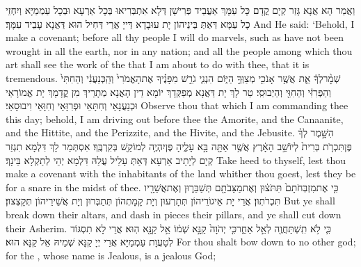 {וַאֲמַר הָא אֲנָא גָּזַר קְיָם קֳדָם כָּל עַמָּךְ אַעֲבֵיד פְּרִישָׁן דְּלָא אִתְבְּרִיאוּ בְּכָל אַרְעָא וּבְכָל עַמְמַיָּא וְיִחְזֵי כָל עַמָּא דְּאַתְּ בֵּינֵיהוֹן יָת עוּבָדָא דַּייָ אֲרֵי דְּחִיל הוּא דַּאֲנָא עָבֵיד עִמָּךְ׃}
{And He said: ‘Behold, I make a covenant; before all thy people I will do marvels, such as have not been wrought in all the earth, nor in any nation; and all the people among which thou art shall see the work of the \lord\space that I am about to do with thee, that it is tremendous.}{}
{שְׁמׇ֨ר\maqqaf לְךָ֔ אֵ֛ת אֲשֶׁ֥ר אָנֹכִ֖י מְצַוְּךָ֣ הַיּ֑וֹם הִנְנִ֧י גֹרֵ֣שׁ מִפָּנֶ֗יךָ אֶת\maqqaf הָאֱמֹרִי֙ וְהַֽכְּנַעֲנִ֔י וְהַחִתִּי֙ וְהַפְּרִזִּ֔י וְהַחִוִּ֖י וְהַיְבוּסִֽי׃}
{טַר לָךְ יָת דַּאֲנָא מְפַקְּדָךְ יוֹמָא דֵין הָאֲנָא מְתָרֵיךְ מִן קֳדָמָךְ יָת אֱמוֹרָאֵי וּכְנַעֲנָאֵי וְחִתָּאֵי וּפְרִזָּאֵי וְחִוָּאֵי וִיבוּסָאֵי׃}
{Observe thou that which I am commanding thee this day; behold, I am driving out before thee the Amorite, and the Canaanite, and the Hittite, and the Perizzite, and the Hivite, and the Jebusite.}{}
{הִשָּׁ֣מֶר לְךָ֗ פֶּן\maqqaf תִּכְרֹ֤ת בְּרִית֙ לְיוֹשֵׁ֣ב הָאָ֔רֶץ אֲשֶׁ֥ר אַתָּ֖ה בָּ֣א עָלֶ֑יהָ פֶּן\maqqaf יִהְיֶ֥ה לְמוֹקֵ֖שׁ בְּקִרְבֶּֽךָ׃}
{אִסְתְּמַר לָךְ דִּלְמָא תִגְזַר קְיָם לְיָתֵיב אַרְעָא דְּאַתְּ עָלֵיל עֲלַהּ דִּלְמָא יְהֵי לְתַקְלָא בֵּינָךְ׃}
{Take heed to thyself, lest thou make a covenant with the inhabitants of the land whither thou goest, lest they be for a snare in the midst of thee.}{}
{כִּ֤י אֶת\maqqaf מִזְבְּחֹתָם֙ תִּתֹּצ֔וּן וְאֶת\maqqaf מַצֵּבֹתָ֖ם תְּשַׁבֵּר֑וּן וְאֶת\maqqaf אֲשֵׁרָ֖יו תִּכְרֹתֽוּן׃}
{אֲרֵי יָת אֵיגוֹרֵיהוֹן תְּתָרְעוּן וְיָת קָמָתְהוֹן תְּתַבְּרוּן וְיָת אֲשֵׁירֵיהוֹן תְּקָצְצוּן׃}
{But ye shall break down their altars, and dash in pieces their pillars, and ye shall cut down their Asherim.}{}
{כִּ֛י לֹ֥א תִֽשְׁתַּחֲוֶ֖ה לְאֵ֣ל אַחֵ֑\large ר\normalsize\space כִּ֤י יְהֹוָה֙ קַנָּ֣א שְׁמ֔וֹ אֵ֥ל קַנָּ֖א הֽוּא׃}
{אֲרֵי לָא תִסְגּוֹד לְטָעֲוָת עַמְמַיָּא אֲרֵי יְיָ קַנָּא שְׁמֵיהּ אֵל קַנָּא הוּא׃}
{For thou shalt bow down to no other god; for the \lord, whose name is Jealous, is a jealous God;}{}
